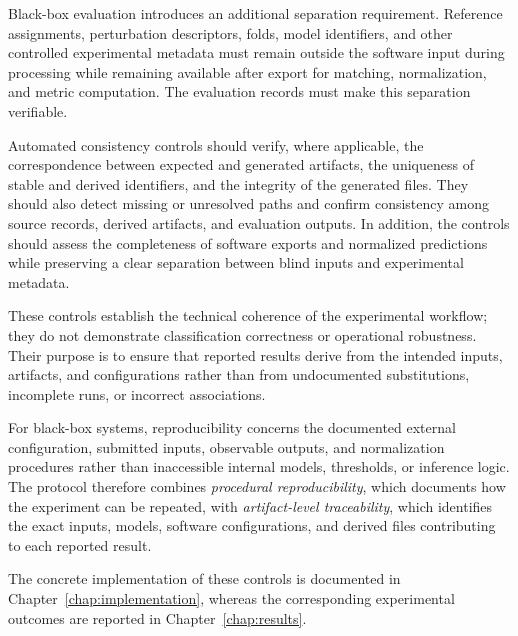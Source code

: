 Black-box evaluation introduces an additional separation requirement. Reference
assignments, perturbation descriptors, folds, model identifiers, and other
controlled experimental metadata must remain outside the software input during
processing while remaining available after export for matching, normalization,
and metric computation. The evaluation records must make this separation
verifiable.

Automated consistency controls should verify, where applicable, the
correspondence between expected and generated artifacts, the uniqueness of
stable and derived identifiers, and the integrity of the generated files. They
should also detect missing or unresolved paths and confirm consistency among
source records, derived artifacts, and evaluation outputs. In addition, the
controls should assess the completeness of software exports and normalized
predictions while preserving a clear separation between blind inputs and
experimental metadata.

These controls establish the technical coherence of the experimental workflow;
they do not demonstrate classification correctness or operational robustness.
Their purpose is to ensure that reported results derive from the intended
inputs, artifacts, and configurations rather than from undocumented
substitutions, incomplete runs, or incorrect associations.

For black-box systems, reproducibility concerns the documented external
configuration, submitted inputs, observable outputs, and normalization
procedures rather than inaccessible internal models, thresholds, or inference
logic. The protocol therefore combines \textit{procedural reproducibility},
which documents how the experiment can be repeated, with
\textit{artifact-level traceability}, which identifies the exact inputs,
models, software configurations, and derived files contributing to each
reported result.

The concrete implementation of these controls is documented in
Chapter~\ref{chap:implementation}, whereas the corresponding experimental
outcomes are reported in Chapter~\ref{chap:results}.






